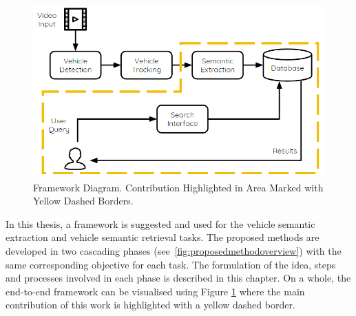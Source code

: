 \begin{figure}[hbt!]\centering
\includegraphics[width=.9\textwidth]{image/new/framework_new.PNG}
\caption{Framework Diagram. Contribution Highlighted in Area Marked with Yellow Dashed Borders.}
\label{fig:framework}
\end{figure}

In this thesis, a framework is suggested and used for the vehicle semantic extraction and vehicle semantic retrieval tasks.
The proposed methods are developed in two cascading phases (see~\ref{fig:proposedmethodoverview}) with the same corresponding objective for each task.
The formulation of the idea, steps and processes involved in each phase is described in this chapter.
On a whole, the end-to-end framework can be visualised using Figure \ref{fig:framework} where the main contribution of this work is highlighted with a yellow dashed border.

